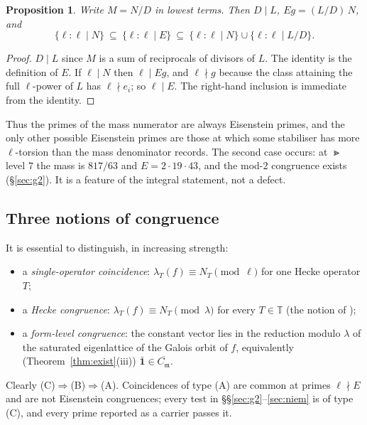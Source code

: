 \documentclass[11pt]{amsart}
\newtheorem{proposition}[theorem]{Proposition}
\theoremstyle{definition}
\newcommand{\T}{\mathbb{T}}\newcommand{\Tr}{\operatorname{Tr}}\newcommand{\Aut}{\operatorname{Aut}}\newcommand{\Stab}{\operatorname{Stab}}
\begin{document}
\begin{proposition}\label{prop:E}
Write $M=N/D$ in lowest terms. Then $D\mid L$, $Eg=(L/D)\,N$, and
\[\{\ell:\ell\mid N\}\ \subseteq\ \{\ell:\ell\mid E\}\ \subseteq\ \{\ell:\ell\mid N\}\cup\{\ell:\ell\mid L/D\}.\]
\end{proposition}
\begin{proof}
$D\mid L$ since $M$ is a sum of reciprocals of divisors of $L$. The identity is the definition of $E$. If $\ell\mid N$ then $\ell\mid Eg$, and $\ell\nmid g$ because the class attaining the full $\ell$-power of $L$ has $\ell\nmid e_i$; so $\ell\mid E$. The right-hand inclusion is immediate from the identity.
\end{proof}
Thus the primes of the mass numerator are always Eisenstein primes, and the only other possible Eisenstein primes are those at which some stabiliser has more $\ell$-torsion than the mass denominator records. The second case occurs: at $\Gt$ level $7$ the mass is $817/63$ and $E=2\cdot19\cdot43$, and the mod-$2$ congruence exists (\S\ref{sec:g2}). It is a feature of the integral statement, not a defect.

\subsection{Three notions of congruence} It is essential to distinguish, in increasing strength:
\begin{itemize}
\item[(A)] a \emph{single-operator coincidence}: $\lambda_T(f)\equiv N_T\pmod\ell$ for one Hecke operator $T$;
\item[(B)] a \emph{Hecke congruence}: $\lambda_T(f)\equiv N_T\pmod\lambda$ for every $T\in\T$ (the notion of \cite{MW24});
\item[(C)] a \emph{form-level congruence}: the constant vector lies in the reduction modulo $\lambda$ of the saturated eigenlattice of the Galois orbit of $f$, equivalently (Theorem~\ref{thm:exist}(iii)) $\bar{\mathbf 1}\in\overline{C_{\mathfrak m}}$.
\end{itemize}
Clearly (C)$\Rightarrow$(B)$\Rightarrow$(A). Coincidences of type (A) are common at primes $\ell\nmid E$ and are not Eisenstein congruences; every test in \S\S\ref{sec:g2}--\ref{sec:niem} is of type (C), and every prime reported as a carrier passes it.
\end{document}
